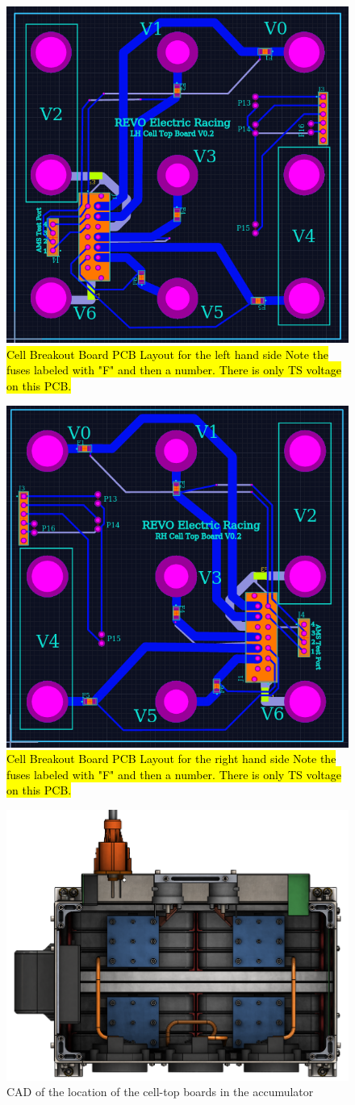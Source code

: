 \documentclass{article}
\DeclareRobustCommand{\hlr}[1]{{\sethlcolor{red}\hl{#1}}}
\begin{document}
            
            \begin{figure}[H]
                \centering
                \includegraphics[width = 0.4 \textwidth]{CellTopLH}
                \caption{\hlr{Cell Breakout Board PCB Layout for the left hand side Note the fuses labeled with "F" and then a number. There is only TS voltage on this PCB.}} %
                \label{celltopLH}
            \end{figure}
            
            \begin{figure}[H]
                \centering
                \includegraphics[width = 0.4 \textwidth]{CellTopRH}
                \caption{\hlr{Cell Breakout Board PCB Layout for the right hand side Note the fuses labeled with "F" and then a number. There is only TS voltage on this PCB.}}
                \label{celltopRH}
            \end{figure}
            
            \begin{figure}[H]
                \centering
                \includegraphics[width = 0.6 \textwidth]{batterybox_topview}
                \caption{CAD of the location of the cell-top boards in the accumulator}
                \label{accumtopcad}
            \end{figure}
\end{document}
